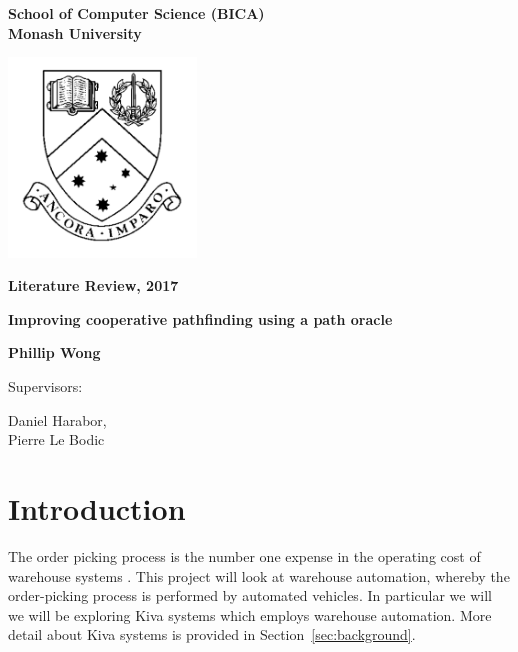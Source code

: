 \documentclass[a4paper,11pt]{article}
\begin{document}
	
\thispagestyle{empty} %
\renewcommand{\thepage}{\roman{page}}

\begin{spacing}{1.5}
	\begin{center}
		{\Large \bfseries
			School of Computer Science (BICA) \\
			Monash University}
		
		
		\vspace*{30mm}
		
		\includegraphics[width=5cm]{graphics/MonashCrest.pdf}
		
		\vspace*{15mm}
		
		{\large \bfseries
			Literature Review, 2017
		}
		
		\vspace*{10mm}
		
		{\LARGE \bfseries
			Improving cooperative pathfinding using a path oracle
		}
		
		\vspace*{20mm}
		
		{\large \bfseries
			Phillip Wong
			
			\vspace*{20mm}
			
			
			Supervisors: \parbox[t]{50mm}{Daniel Harabor,\\Pierre Le Bodic}
		}
		
	\end{center}
\end{spacing}

\newpage

\tableofcontents

\newpage
\setcounter{page}{1}
\renewcommand{\thepage}{\arabic{page}}



\section{Introduction}
The order picking process is the number one expense in the operating cost of warehouse systems \cite{de2007design}. This project will look at warehouse automation, whereby the order-picking process is performed by automated vehicles. In particular we will we will be exploring Kiva systems which employs warehouse automation. More detail about Kiva systems is provided in Section~\ref{sec:background}.
\end{document}
